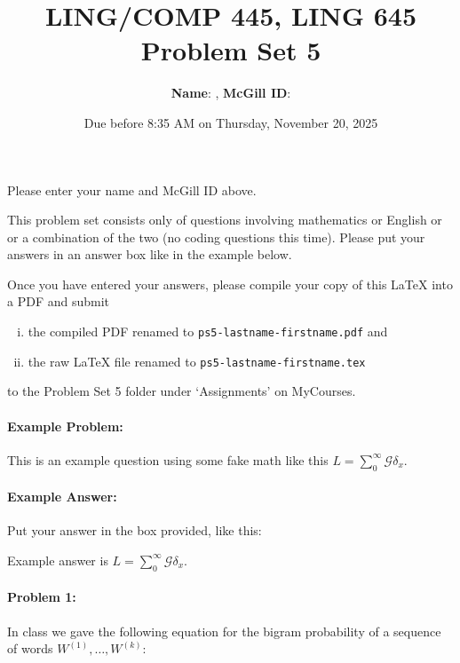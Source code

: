 \documentclass[10pt]{article}
\author{ 
  \textbf{Name}:       %
, \textbf{McGill ID}:  %
}
\newenvironment{AnswerBox}{\begin{mdframed}[style=simple]}{\end{mdframed}}
\newcommand{\PSnum}{5}
\begin{document}
\title{LING/COMP 445, LING 645\\Problem Set \PSnum}
\date{Due before 8:35 AM on Thursday, November 20, 2025}
\maketitle
Please enter your name and McGill ID above.

This problem set consists only of questions involving mathematics or
English or or a combination of the two (no coding questions this time).
Please put your answers in an answer box like in the example below.

Once you have entered your answers, please compile your copy of this
\LaTeX{} into a PDF and submit 
\begin{enumerate}[(i),noitemsep]
\item
the compiled PDF renamed to
\texttt{ps\PSnum-lastname-firstname.pdf} and
\item
the raw \LaTeX{} file renamed to
\texttt{ps\PSnum-lastname-firstname.tex}
\end{enumerate}
to the Problem Set \PSnum{} folder under `Assignments' on MyCourses.


\hrulefill %

\paragraph{Example Problem:}
This is an example question using some fake math like this
$L=\sum_0^{\infty} \mathcal{G} \delta_x$.

\paragraph{Example Answer:} Put your answer in the box provided, like this:
\begin{AnswerBox}
Example answer is $L=\sum_0^{\infty} \mathcal{G} \delta_x$.
\end{AnswerBox}


\hrulefill%

\pagebreak%

\hrulefill %

\paragraph{Problem 1:}
 
In class we gave the following equation for the bigram probability of
a sequence of words $W^{(1)},\dots,W^{(k)}$:
\end{document}
